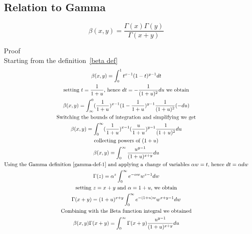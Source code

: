 \documentclass[a4paper]{article}
\begin{document}
    \subsection{Relation to Gamma}\label{subsec:relation-to-gamma}
    \begin{theorem}
        \label{relation to beta}
        \begin{equation}
            \boxed{
                \beta(x, y) = \frac{\Gamma(x) \Gamma(y)}{\Gamma(x+y)}
            }\label{eq:equation24}
        \end{equation}

        Proof
        \\
        Starting from the definition~\ref{beta def}
        \begin{gather*}
            \beta(x, y) = \int_{0}^{1} t^{x-1} (1-t)^{y-1} dt
            \\
            \text{setting $t = \frac{1}{1+u}$, hence $dt = -\frac{1}{(1+u)^2} du$ we obtain}
            \\
            \beta(x, y) = \int_{\infty}^{0} (\frac{1}{1+u})^{x-1} (1-\frac{1}{1+u})^{y-1} \frac{1}{(1+u)^2} (-du)
            \\
            \text{Switching the bounds of integration and simplifying we get}
            \\
            \beta(x, y) = \int_{0}^{\infty} (\frac{1}{1+u})^{x-1} (\frac{u}{1+u})^{y-1} \frac{1}{(1+u)^2} du
            \\
            \text{collecting powers of $(1+u)$}
            \\
            \beta(x, y) = \int_{0}^{\infty}
            \frac{u^{y-1}}{(1+u)^{x+y}} du
            \\
            \text{Using the Gamma definition~\ref{gamma-def-1} and applying a change of variables $\alpha w = t$, hence $dt = \alpha dw$}
            \\
            \Gamma(z) = \alpha^z  \int_{0}^{\infty} e^{-\alpha w} w^{z-1} dw
            \\
            \text{setting $z = x+y$ and $\alpha = 1+u$, we obtain}
            \\
            \Gamma(x+y) = (1+u)^{x+y}  \int_{0}^{\infty} e^{-(1+u) w} w^{x+y-1} dw
            \\
            \text{Combining with the Beta function integral we obtained}
            \\
            \beta(x, y) \Gamma(x+y) = \int_{0}^{\infty}  \Gamma(x+y) \frac{u^{y-1}}{(1+u)^{x+y}} du
            \\

\end{gather*}
\end{theorem}
\end{document}
